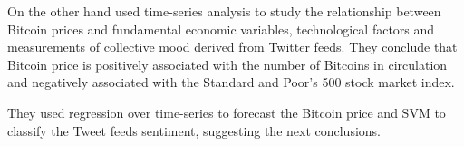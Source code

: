 On the other hand \cite{georgoula_using_2015} used time-series
analysis to study the relationship between Bitcoin prices and
fundamental economic variables, technological factors and measurements
of collective mood derived from Twitter feeds. They conclude that
Bitcoin price is positively associated with the number of Bitcoins in
circulation and negatively associated with the Standard and Poor's 500
stock market index.


They used regression over time-series to forecast the Bitcoin price
and SVM to classify the Tweet feeds sentiment, suggesting the next
conclusions.

